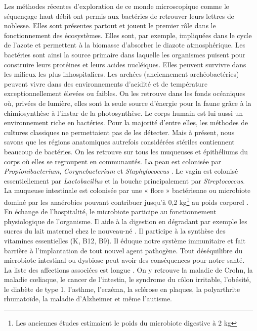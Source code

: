 \documentclass[12pt,a4paper]{article}
\begin{document}
Les méthodes récentes d'exploration de ce monde microscopique comme le séquençage haut débit ont permis aux bactéries de retrouver leurs lettres de noblesse.
Elles sont présentes partout et jouent le premier rôle dans le fonctionnement des écosystèmes. Elles sont, par exemple, impliquées dans le cycle de l'azote et permettent à la biomasse d'absorber le diazote atmosphérique. Les bactéries sont ainsi la source primaire dans laquelle les organismes puisent pour construire leurs protéines et leurs acides nucléiques.
Elles peuvent survivre dans les milieux les plus inhospitaliers. Les archées (anciennement archéobactéries) peuvent vivre dans des environnements d'acidité et de température exceptionnellement élevées ou faibles. On les retrouve dans les fonds océaniques où, privées de lumière, elles sont la seule source d'énergie pour la faune grâce à la chimiosynthèse à l'instar de la photosynthèse.
Le corps humain est lui aussi un environnement riche en bactéries. Pour la majorité d'entre elles, les méthodes de cultures classiques ne permettaient pas de les détecter. Mais à présent, nous savons que les régions anatomiques autrefois considérées stériles contiennent beaucoup de bactéries.
On les retrouve sur tous les muqueuses et épithéliums du corps où elles se regroupent en communautés.
La peau est colonisée par \textit{Propionibacterium}, \textit{Corynebacterium} et \textit{Staphylococcus} \cite{Yong2017}. Le vagin est colonisé essentiellement par \textit{Lactobacillus} et la bouche principalement par \textit{Streptococcus}\cite{Yong2017}.
La muqueuse intestinale est colonisée par une « flore » bactérienne ou microbiote dominé par les anaérobies pouvant contribuer jusqu'à 0,2 kg\footnote{Les anciennes études estimaient le poids du microbiote digestive à 2 kg} au poids corporel \citep{Sender2016}.
En échange de l'hospitalité, le microbiote participe au fonctionnement physiologique de l'organisme. Il aide à la digestion en dégradant par exemple les sucres du lait maternel chez le nouveau-né \cite{Bode2012,Yong2017}. Il participe à la synthèse des vitamines essentielles (K, B12, B9)\cite{LeBlanc2013,Yong2017}. Il éduque notre système immunitaire et fait barrière à l'implantation de tout nouvel agent pathogène.
Tout déséquilibre du microbiote intestinal ou dysbiose peut avoir des conséquences pour notre santé. La liste des affections associées est longue \cite{Yong2017}. On y retrouve la maladie de Crohn, la maladie cœliaque, le cancer de l’intestin, le syndrome du côlon irritable, l’obésité, le diabète de type 1, l’asthme, l’eczéma, la sclérose en plaques, la polyarthrite rhumatoïde, la maladie d’Alzheimer et même l’autisme. \\
\end{document}

